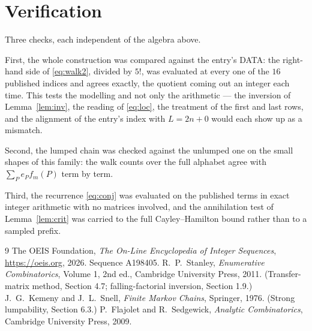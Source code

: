 \documentclass[11pt,a4paper]{article}
\theoremstyle{plain}
\theoremstyle{definition}
\begin{document}
\section{Verification}

Three checks, each independent of the algebra above.

First, the whole construction was compared against the entry's DATA: the right-hand side of
\eqref{eq:walk2}, divided by $5!$, was evaluated at every one of the $16$
published indices and agrees exactly, the quotient coming out an integer each time. This
tests the modelling and not only the arithmetic --- the inversion of Lemma~\ref{lem:inv},
the reading of \eqref{eq:loc}, the treatment of the first and last rows, and the
alignment of the entry's index with $L=2n+0$ would each show up as a mismatch.

Second, the lumped chain was checked against the unlumped one on the small shapes of this
family: the walk counts over the full alphabet agree with $\sum_P e_Pf_m(P)$ term by term.

Third, the recurrence \eqref{eq:conj} was evaluated on the published terms in exact integer
arithmetic with no matrices involved, and the annihilation test of Lemma~\ref{lem:crit} was
carried to the full Cayley--Hamilton bound rather than to a sampled prefix.

\begin{thebibliography}{9}
 The OEIS Foundation, \emph{The On-Line Encyclopedia of Integer
Sequences}, \url{https://oeis.org}, 2026. Sequence A198405.
 R.~P.~Stanley, \emph{Enumerative Combinatorics}, Volume 1, 2nd ed.,
Cambridge University Press, 2011. (Transfer-matrix method, Section 4.7; falling-factorial
inversion, Section 1.9.)
 J.~G.~Kemeny and J.~L.~Snell, \emph{Finite Markov Chains}, Springer,
1976. (Strong lumpability, Section 6.3.)
 P.~Flajolet and R.~Sedgewick, \emph{Analytic Combinatorics}, Cambridge
University Press, 2009.
\end{thebibliography}
\end{document}
